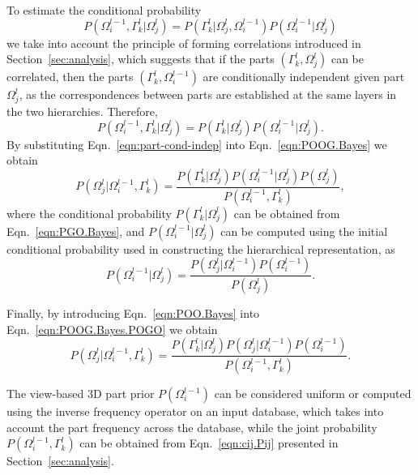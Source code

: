 \documentclass[runningheads]{llncs}
\begin{document}
To estimate the conditional probability
\begin{equation}
 P(\Omega_i^{l-1},\Gamma_k^l \vert \Omega_j^{l}) =  P(\Gamma_k^l \vert \Omega_j^{l},\Omega_i^{l-1}) P(\Omega_i^{l-1} \vert \Omega_j^{l})
\end{equation}
we take into account the principle of forming correlations introduced in Section~\ref{sec:analysis}, which suggests that if the parts $(\Gamma_k^l,\Omega_j^{l})$ can be correlated, then the parts $(\Gamma_k^l,\Omega_i^{l-1})$ are conditionally independent given part $\Omega_j^{l}$, as the correspondences between parts are established at the same layers in the two hierarchies. Therefore,
\begin{equation}
  P(\Omega_i^{l-1},\Gamma_k^l \vert \Omega_j^{l}) =  P(\Gamma_k^l \vert \Omega_j^{l}) P(\Omega_i^{l-1} \vert \Omega_j^{l}).
  \label{eqn:part-cond-indep}
\end{equation}
By substituting Eqn.~\ref{eqn:part-cond-indep} into Eqn.~\ref{eqn:POOG.Bayes} we obtain
\begin{equation}
  P(\Omega_j^{l} \vert \Omega_i^{l-1},\Gamma_k^l) = \frac{P(\Gamma_k^l \vert \Omega_j^{l})P(\Omega_i^{l-1} \vert \Omega_j^{l})P(\Omega_j^{l})}{P(\Omega_i^{l-1},\Gamma_k^l)},
  \label{eqn:POOG.Bayes.POGO}
\end{equation}
where the conditional probability $P(\Gamma_k^l \vert \Omega_j^l)$ can be obtained from Eqn.~\ref{eqn:PGO.Bayes}, and $P(\Omega_i^{l-1} \vert \Omega_j^{l})$ can be computed using the initial conditional probability used in constructing the hierarchical representation, as
\begin{equation}
  P(\Omega_i^{l-1} \vert \Omega_j^{l}) = \frac{P(\Omega_j^{l}\vert \Omega_i^{l-1})P(\Omega_i^{l-1})}{P(\Omega_j^{l})}.
  \label{eqn:POO.Bayes}
 \end{equation}

Finally, by introducing Eqn.~\ref{eqn:POO.Bayes} into Eqn.~\ref{eqn:POOG.Bayes.POGO} we obtain
\begin{equation}
 P(\Omega_j^{l} \vert \Omega_i^{l-1},\Gamma_k^l) = \frac{P(\Gamma_k^l \vert \Omega_j^{l})P(\Omega_j^{l} \vert \Omega_i^{l-1})P(\Omega_i^{l-1})}{P(\Omega_i^{l-1},\Gamma_k^l)}.
\end{equation}
  
The view-based 3D part prior $P(\Omega_i^{l-1})$ can be considered uniform or computed using the inverse frequency operator on an input database, which takes into account the part frequency across the database, while the joint probability $P(\Omega_i^{l-1},\Gamma_k^l)$ can be obtained from Eqn.~\ref{eqn:cij.Pij} presented in Section~\ref{sec:analysis}.
\end{document}
